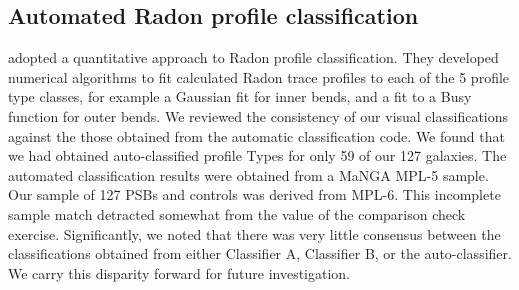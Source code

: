 \subsection{Automated Radon profile classification}
\label{auto-clasifier}
\cite{2018MNRAS.480.2217S} adopted a quantitative approach to Radon profile classification. They developed numerical algorithms to fit calculated Radon trace profiles to each of the 5 profile type classes, for example a Gaussian fit for inner bends, and a fit to a Busy function \citep{2014ascl.soft02015W} for outer bends. We reviewed the consistency of our visual classifications against the those obtained from the automatic classification code. We found that we had obtained auto-classified profile Types for only 59 of our 127 galaxies. The automated classification results were obtained from a MaNGA MPL-5 sample. Our sample of 127 PSBs and controls was derived from MPL-6. This incomplete sample match detracted somewhat from the value of the comparison check exercise. Significantly, we noted that there was very little consensus between the classifications obtained from either Classifier A, Classifier B, or the auto-classifier. We carry this disparity forward for future investigation.